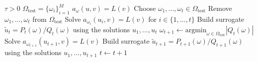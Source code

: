\begin{algorithmic}
    \Require $\tau > 0$ 
    \Require $\Omega_{\mathrm{test}} = \{\omega_i\}_{i=1}^M$ 
    \Require $a_{\omega}(u, v) = L(v)$ 
    \State Choose $\omega_1, \dots, \omega_t \in \Omega_{\mathrm{test}}$ 
    \State Remove $\omega_1, \dots, \omega_t$ from $\Omega_{\mathrm{test}}$
    \State Solve $a_{\omega_i}(u_i, v) = L(v)$ for $i \in \{1, \dots, t\}$
    \State Build surrogate $\tilde{u}_t = P_t(\omega) / Q_t(\omega)$ using the solutions $u_1, \dots, u_t$
        \State $\omega_{t+1} \leftarrow \textrm{argmin}_{\omega \in \Omega_{\mathrm{test}}} |Q_t(\omega)|$
        \State Solve $a_{\omega_{t+1}}(u_{t+1}, v) = L(v)$
        \State Build surrogate $\tilde{u}_{t+1} = P_{t+1}(\omega) / Q_{t+1}(\omega)$ using the solutions $u_1, \dots, u_{t+1}$
            \Return
        \EndIf
        \State $t \leftarrow t+1$
    \EndWhile
\end{algorithmic}